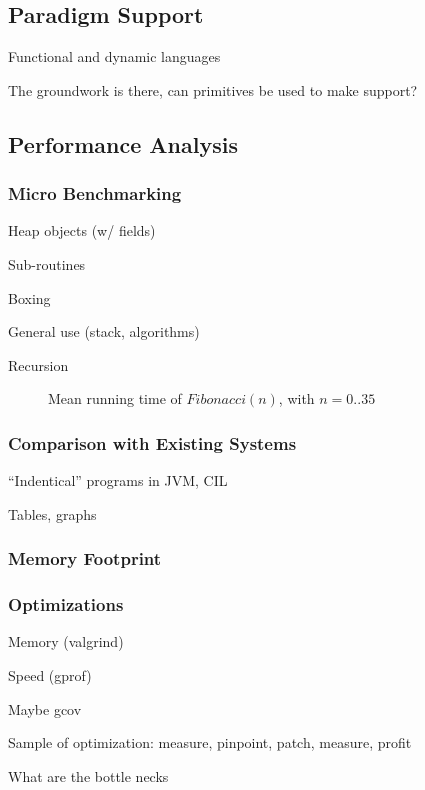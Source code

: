 \subsection{Paradigm Support}

Functional and dynamic languages

The groundwork is there, can primitives be used to make support?

\subsection{Performance Analysis}

\subsubsection{Micro Benchmarking}

Heap objects (w/ fields)

Sub-routines

Boxing

General use (stack, algorithms)

Recursion
\begin{figure}[H]
  \centering
  
  \caption{Mean running time of $Fibonacci(n)$, with $n = 0..35$}
\end{figure}

\subsubsection{Comparison with Existing Systems}

``Indentical'' programs in JVM, CIL

Tables, graphs

\subsubsection{Memory Footprint}

\subsubsection{Optimizations}

Memory (valgrind)

Speed (gprof)

Maybe gcov

Sample of optimization: measure, pinpoint, patch, measure, profit

What are the bottle necks

